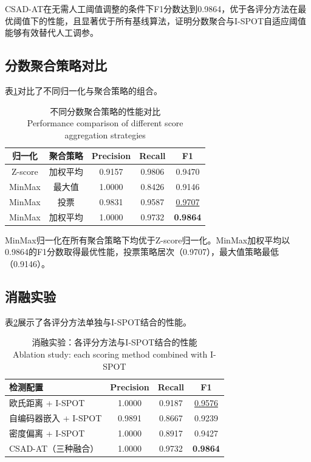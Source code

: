 \documentclass[10.5pt,a4paper,twocolumn]{ctexart}
\newcommand{\bicaption}[2]{%
  \caption{#1\\{\small #2}}%
}
\begin{document}
CSAD-AT在无需人工阈值调整的条件下F1分数达到0.9864，优于各评分方法在最优阈值下的性能，且显著优于所有基线算法，证明分数聚合与I-SPOT自适应阈值能够有效替代人工调参。

\subsection{分数聚合策略对比}

表\ref{tab:agg_compare}对比了不同归一化与聚合策略的组合。

\begin{table}[htbp]
    \centering
    \bicaption{不同分数聚合策略的性能对比}{Performance comparison of different score aggregation strategies}
    \label{tab:agg_compare}
    \begin{tabular}{ccccc}
        \toprule
        归一化 & 聚合策略 & Precision & Recall & F1 \\
        \midrule
        Z-score & 加权平均 & 0.9157 & 0.9806 & 0.9470 \\
        MinMax  & 最大值   & 1.0000 & 0.8426 & 0.9146 \\
        MinMax  & 投票     & 0.9831 & 0.9587 & \underline{0.9707} \\
        MinMax  & 加权平均 & 1.0000 & 0.9732 & \textbf{0.9864} \\
        \bottomrule
    \end{tabular}
\end{table}

MinMax归一化在所有聚合策略下均优于Z-score归一化。MinMax加权平均以0.9864的F1分数取得最优性能，投票策略居次（0.9707），最大值策略最低（0.9146）。

\subsection{消融实验}

表\ref{tab:ablation}展示了各评分方法单独与I-SPOT结合的性能。

\begin{table}[htbp]
    \centering
    \bicaption{消融实验：各评分方法与I-SPOT结合的性能}{Ablation study: each scoring method combined with I-SPOT}
    \label{tab:ablation}
    \begin{tabular}{lccc}
        \toprule
        检测配置 & Precision & Recall & F1 \\
        \midrule
        欧氏距离 + I-SPOT     & 1.0000 & 0.9187 & \underline{0.9576} \\
        自编码器嵌入 + I-SPOT  & 0.9891 & 0.8667 & 0.9239 \\
        密度偏离 + I-SPOT      & 1.0000 & 0.8917 & 0.9427 \\
        \midrule
        CSAD-AT（三种融合）    & 1.0000 & 0.9732 & \textbf{0.9864} \\
        \bottomrule
    \end{tabular}
\end{table}
\end{document}
